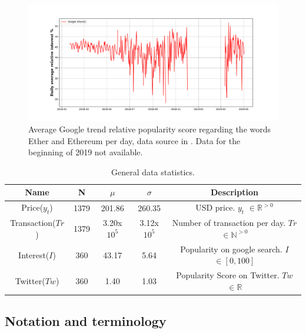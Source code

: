 \begin{figure}[htpb!] %
	\centering %
	\includegraphics[width=\textwidth]{data/google.pdf} %
	\caption{  Average Google trend relative popularity score regarding the words Ether and Ethereum per day, data source in \cite{deepblueai}. Data for the beginning of 2019 not available.} %
	\label{fig:google_plot} %
\end{figure}


\begin{table}[h!]
	\begin{center}
		\begin{tabular}{||c c c c c||} 
			\hline
			Name & N & $\mu$ & $\sigma$ & Description\\ [0.5ex] 
			\hline\hline
			Price($y_{t}$) & 1379 & 201.86 & 260.35 & USD price. $y_{t}$ $\in \mathbb{R}^{>0}$ \\ 
			\hline
			Transaction($Tr$) & 1379 & 3.20x$10^{5}$ & 3.12x$10^{5}$ & Number of transaction per day. $Tr$ $\in \mathbb{N}^{>0}$  \\ 
			\hline
			Interest($I$) & 360 & 43.17 & 5.64 & Popularity on google search. $I$ $\in [0,100]$  \\
			\hline
			Twitter($Tw$) & 360 & 1.40 & 1.03 & Popularity Score on Twitter.  $Tw$ $\in \mathbb{R}$ \\
			\hline
		\end{tabular}
		\caption{General data statistics.}
		\label{table:general_statistics}
	\end{center}
\end{table}


\subsection{Notation and terminology}

